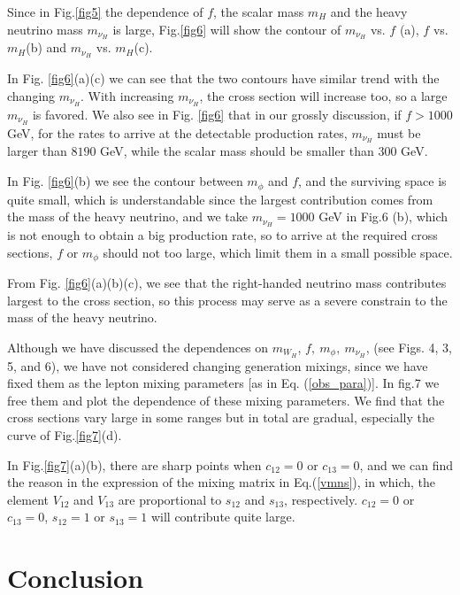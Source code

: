 \documentclass[preprint,aps,12pt,showpacs,nofootinbib,tightenlines]{revtex4}
\begin{document}
Since in Fig.\ref{fig5} the dependence of $f$, the scalar mass $m_{H}$ and the heavy neutrino mass $m_{\nu_H}$
is large, Fig.\ref{fig6} will show the contour of $m_{\nu_H}$ vs. $f$ (a), $f$ vs. $m_{H}$(b)  and $m_{\nu_H}$ vs. $m_{H}$(c).


In Fig. \ref{fig6}(a)(c) we can see that the two contours have similar trend with the changing $m_{\nu_H}$.
 With increasing $m_{\nu_H}$, the cross section will increase too, so a large $m_{\nu_H}$
 is favored. We also see in Fig. \ref{fig6} that in our grossly discussion, if $f > 1000$ GeV,
 for the rates to arrive at the detectable production rates, $m_{\nu_H}$ must
  be larger than $8190$ GeV, while the scalar mass should be smaller than $300$ GeV.

In Fig. \ref{fig6}(b) we see the contour between $m_\phi$ and $f$, and the surviving space is quite small, which is understandable
since the largest contribution comes from the mass of the heavy neutrino, and we take $m_{\nu_H}=1000$ GeV in Fig.6 (b), which is
not enough to obtain a big production rate, so to arrive at the required cross sections, $f$ or $m_\phi$ should not too large, which
limit them in a small possible space.


From Fig. \ref{fig6}(a)(b)(c), we see that the right-handed neutrino mass contributes largest to the cross section, so this process may
serve as a severe constrain to the mass of the heavy neutrino.

Although we have discussed the dependences on $m_{W_H}$, $f,~ m_\phi , ~m_{\nu_H}$,
(see Figs. 4, 3, 5, and 6), we have not considered changing generation mixings, since we have
fixed them as the lepton mixing parameters [as in Eq. (\ref{obs_para})].
 In fig.7 we free them and plot the dependence of these mixing parameters.
 We find that the cross sections vary large in some ranges but in total are gradual, especially the curve of Fig.\ref{fig7}(d).

 In Fig.\ref{fig7}(a)(b), there are sharp points when $c_{12}=0$ or $c_{13}=0$, and we can find the reason in the expression
 of the mixing matrix in Eq.(\ref{vmns}), in which, the element $V_{12}$ and $V_{13}$ are proportional to $s_{12}$ and $s_{13}$, respectively.
 $c_{12}=0$ or $c_{13}=0$, $s_{12}=1$ or $s_{13}=1$ will contribute quite large.







\section{Conclusion}
\end{document}
